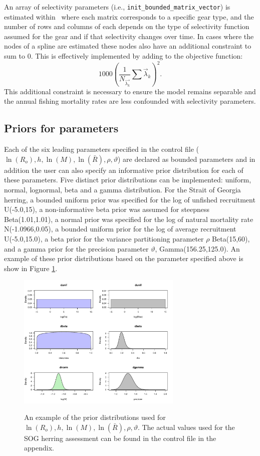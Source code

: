 An array of selectivity parameters (i.e., \verb"init_bounded_matrix_vector") is estimated within \iscam\, where each matrix corresponds to a specific gear type, and the number of rows and columns of each depends on the type of selectivity function assumed for the gear and if that selectivity changes over time.  In cases where the nodes of a spline are estimated these nodes also have an additional constraint to sum to 0.  This is effectively implemented by adding to the objective function: \[ 1000 \left(\frac{1}{N_{\vec{\lambda_k}}}\sum \vec{\lambda}_k \right)^2.\]  This additional constraint is necessary to ensure the model remains separable and the annual fishing mortality rates are less confounded with selectivity parameters.

\subsection{Priors for parameters}
	Each of the six leading parameters specified in the control file ($\ln(R_o),h,\ln(M),\ln(\bar{R}),\rho,\vartheta$) are declared as bounded parameters and in addition the user can also specify an informative prior distribution for each of these parameters.  Five distinct prior distributions can be implemented: uniform, normal, lognormal, beta and a gamma distribution.  For the Strait of Georgia herring, a bounded uniform prior was specified for  the log of unfished recruitment U(-5.0,15), a non-informative beta prior was assumed for steepness Beta(1.01,1.01), a normal prior was specified for the log of natural mortality rate N(-1.0966,0.05), a bounded uniform prior for the log of average recruitment U(-5.0,15.0), a beta prior for the variance partitioning parameter $\rho$ Beta(15,60), and a gamma prior for the precision parameter $\vartheta$, Gamma(156.25,125.0). An example of these prior distributions based on the parameter specified above is show in Figure \ref{FigPriorExample}. 
	
\begin{figure}[!tbp]
	\centering
	\includegraphics[width=0.7\textwidth]{../Figs/priorexample.pdf}\\
	\caption{An example of the prior distributions used for $\ln(R_o),h,\ln(M),\ln(\bar{R}),\rho,\vartheta$.  The actual values used for the SOG herring assessment can be found in the control file in the appendix.}\label{FigPriorExample}
\end{figure}

